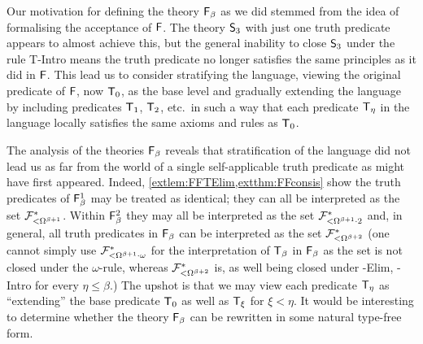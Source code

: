 \documentclass[UKenglish,cleveref,DIV=12]{scrartcl}
\theoremstyle{definition}
\theoremstyle{definition}
\begin{document}
Our motivation for defining the theory $\mathsf{F}_\beta$ as we did stemmed from the
idea of formalising the acceptance of $\mathsf{F}$. The theory $\mathsf{S}_3$ with just one
truth predicate appears to almost achieve this, but the general inability
to close $\mathsf{S}_3$ under the rule T-Intro means the truth predicate no longer
satisfies the same principles as it did in $\mathsf{F}$. This lead us to consider
stratifying the language, viewing the original predicate of $\mathsf{F}$, now $\mathsf{T}_0$, as
the base level and gradually extending the language by including predicates
$\mathsf{T}_1$, $\mathsf{T}_2$, etc.~in such a way that each predicate $\mathsf{T}_\eta$ in the
language locally satisfies the same axioms and rules as $\mathsf{T}_0$.



The analysis of the theories $\mathsf{F}_\beta$ reveals that stratification of the
language did not lead us as far from the world of a single self-applicable truth
predicate as might have first appeared. Indeed,
\cref{extlem:FFTElim,extthm:FFconsis} show the truth predicates of $\mathsf{F}_\beta^1$
may be treated as identical; they can all be interpreted as the set
$\mathcal{F}^*_{<\Omega^{\beta+1}}$. Within $\mathsf{F}_\beta^2$ they may all be interpreted as the
set $\mathcal{F}^*_{<\Omega^{\beta+1}\cdot2}$ and, in general, all truth predicates in
$\mathsf{F}_\beta$ can be interpreted as the set
$\mathcal{F}^*_{\mathord<\Omega^{\beta+2}}$ (one cannot simply use
$\mathcal{F}^*_{\mathord<\Omega^{\beta+1}\cdot\omega}$ for the interpretation of $\mathsf{T}_\beta$ in
$\mathsf{F}_\beta$ as the set is not closed under the $\omega$-rule, whereas
$\mathcal{F}^*_{\mathord<\Omega^{\beta+2}}$ is, as well being closed under \textT\eta-Elim, \textT\eta-Intro for every $\eta\le\beta$.)
The upshot is that we may view each predicate $\mathsf{T}_\eta$ as ``extending'' the base predicate $\mathsf{T}_0$ as well as $\mathsf{T}_\xi$ for $\xi<\eta$. It would be interesting to determine whether the
theory $\mathsf{F}_\beta$ can be rewritten in some natural type-free form.
\end{document}
